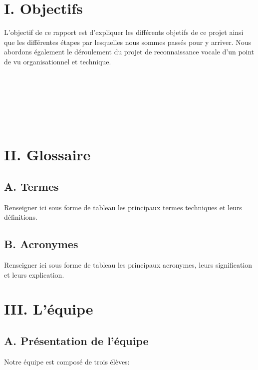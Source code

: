 \documentclass[a4paper,11pt]{book}
\begin{document}
\newpage
\section*{I. Objectifs}
L'objectif de ce rapport est d'expliquer les différents objetifs de ce projet ainsi que les différentes étapes par lesquelles nous sommes passés pour y arriver. Nous abordons également le déroulement du projet de reconnaissance vocale d'un point de vu organisationnel et technique.\\ \\
\\ \\
\\ \\
\\

\newpage
\section*{II. Glossaire}
\subsection*{A. Termes}
Renseigner ici sous forme de tableau les principaux termes techniques et leurs définitions.

\subsection*{B. Acronymes}
Renseigner ici sous forme de tableau les principaux acronymes, leurs signification et leurs explication.

\newpage
\section*{III. L'équipe}
\subsection*{A. Présentation de l'équipe}
Notre équipe est composé de trois élèves:\\ \\
\end{document}

